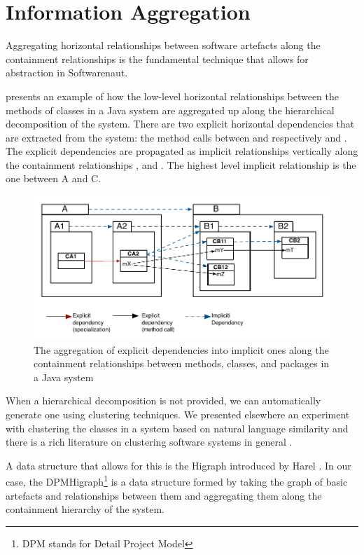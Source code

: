 \documentclass[preprint,12pt]{elsarticle}
\begin{document}
\newpage
\section {Information Aggregation}
\label{sec:org}

Aggregating horizontal relationships between software artefacts along the containment relationships is the fundamental technique that allows for abstraction in Softwarenaut. 

 presents an example of how the low-level horizontal relationships between the methods of classes in a Java system are aggregated up along the hierarchical decomposition of the system. There are two explicit horizontal dependencies that are extracted from the system: the method calls between  and respectively  and . 
The explicit dependencies are propagated as implicit relationships vertically along the containment relationships ,  and . The highest level implicit relationship is the one between A and C. 


\begin{figure}[h]
\begin{center}
\includegraphics[width=0.6\linewidth]{images/DependencyAggregation}
\caption{The aggregation of explicit dependencies into implicit ones along the containment relationships between methods, classes, and packages in a Java system}
\end{center}
\end{figure}

When a hierarchical decomposition is not provided, we can automatically generate one using clustering techniques. We presented elsewhere an experiment with clustering the classes in a system based on natural language similarity\cite{Lung05a} and there is a rich literature on clustering software systems in general \cite{koschke-thesis}.

A data structure that allows for this is the Higraph introduced by Harel \cite{harel-visform}. In our case, the DPMHigraph\footnote{DPM stands for Detail Project Model} is a data structure formed by taking the graph of basic artefacts and relationships between them and aggregating them along the containment hierarchy of the system. 
\end{document}
